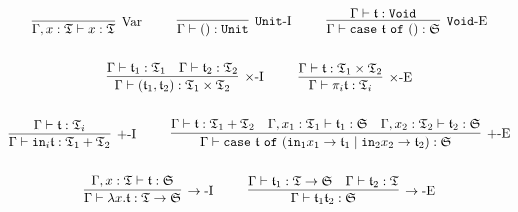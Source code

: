 \begin{gather*}
\infer[\mbox{Var}]{\Gamma, x: \T \vdash x : \T}{}
~~~~ ~~~~
\infer[\mathtt{Unit}\mbox{-I}]{\Gamma \vdash () : \mathtt{Unit}}{}
~~~~ ~~~~
\infer[\mathtt{Void}\mbox{-E}]{\Gamma \vdash \mathtt{case}~\t~\mathtt{of}~() : \mathfrak{S}}{\Gamma \vdash \t : \mathtt{Void}}
\\ \\ 
\infer[\times\mbox{-I}]{\Gamma \vdash (\t_1, \t_2) : \T_1 \times \T_2}{\Gamma \vdash \t_1 : \T_1 & \Gamma \vdash \t_2 : \T_2}
~~~~ ~~~~
\infer[\times\mbox{-E}]{\Gamma \vdash \pi_i \t : \T_i}{\Gamma \vdash \t : \T_1 \times \T_2}
\\ \\ 
\infer[+\mbox{-I}]{\Gamma \vdash \mathtt{in}_i \t : \T_1 + \T_2}{\Gamma \vdash \t : \T_i}
~~~~ ~~~~
\infer[+\mbox{-E}]{\Gamma \vdash \mathtt{case}~\t~\mathtt{of}~(\mathtt{in}_1 x_1 \rightarrow \t_1 \mid \mathtt{in}_2 x_2 \rightarrow \t_2) : \mathfrak{S}}{
    \Gamma \vdash \t : \T_1 + \T_2
    &
    \Gamma, x_1 : \T_1 \vdash \t_1 : \mathfrak{S}
    &
    \Gamma, x_2 : \T_2 \vdash \t_2 : \mathfrak{S}
}
\\ \\
\infer[\rightarrow\mbox{-I}]{\Gamma \vdash \lambda x. \t : \T \rightarrow \mathfrak{S}}{\Gamma, x : \T \vdash \t : \mathfrak{S}}
~~~~ ~~~~
\infer[\rightarrow\mbox{-E}]{\Gamma \vdash \t_1\t_2 : \mathfrak{S}}{
    \Gamma \vdash \t_1 : \T \rightarrow \mathfrak{S}
    &
    \Gamma \vdash \t_2 : \T
}
\end{gather*}
